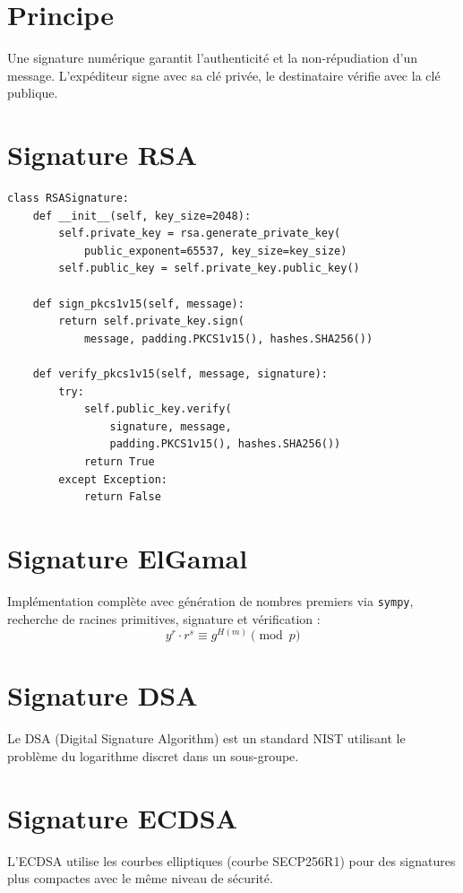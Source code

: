 \documentclass[12pt,a4paper]{report}
\begin{document}
\section{Principe}
Une signature numérique garantit l'authenticité et la non-répudiation d'un message. L'expéditeur signe avec sa clé privée, le destinataire vérifie avec la clé publique.

\section{Signature RSA}
\begin{lstlisting}[style=python,caption=Signatures.py - RSA PKCS\#1 v1.5 et PSS]
class RSASignature:
    def __init__(self, key_size=2048):
        self.private_key = rsa.generate_private_key(
            public_exponent=65537, key_size=key_size)
        self.public_key = self.private_key.public_key()

    def sign_pkcs1v15(self, message):
        return self.private_key.sign(
            message, padding.PKCS1v15(), hashes.SHA256())

    def verify_pkcs1v15(self, message, signature):
        try:
            self.public_key.verify(
                signature, message,
                padding.PKCS1v15(), hashes.SHA256())
            return True
        except Exception:
            return False
\end{lstlisting}

\section{Signature ElGamal}
Implémentation complète avec génération de nombres premiers via \texttt{sympy}, recherche de racines primitives, signature et vérification :
$$y^r \cdot r^s \equiv g^{H(m)} \pmod{p}$$

\section{Signature DSA}
Le DSA (Digital Signature Algorithm) est un standard NIST utilisant le problème du logarithme discret dans un sous-groupe.

\section{Signature ECDSA}
L'ECDSA utilise les courbes elliptiques (courbe SECP256R1) pour des signatures plus compactes avec le même niveau de sécurité.
\end{document}
